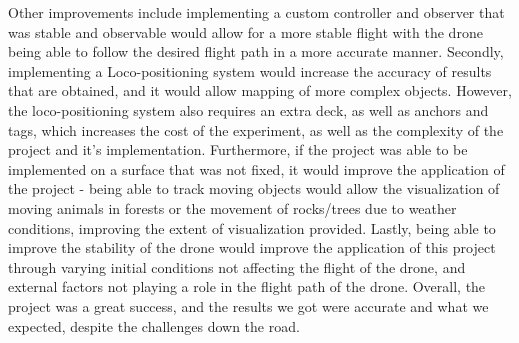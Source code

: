 Other improvements include implementing a custom controller and observer that was stable and observable would allow for a more stable flight with the drone being able to follow the desired flight path in a more accurate manner. Secondly, implementing a Loco-positioning system would increase the accuracy of results that are obtained, and it would allow mapping of more complex objects. However, the loco-positioning system also requires an extra deck, as well as anchors and tags, which increases the cost of the experiment, as well as the complexity of the project and it's implementation. Furthermore, if the project was able to be implemented on a surface that was not fixed, it would improve the application of the project - being able to track moving objects would allow the visualization of moving animals in forests or the movement of rocks/trees due to weather conditions, improving the extent of visualization provided. Lastly, being able to improve the stability of the drone would improve the application of this project through varying initial conditions not affecting the flight of the drone, and external factors not playing a role in the flight path of the drone. Overall, the project was a great success, and the results we got were accurate and what we expected, despite the challenges down the road.


